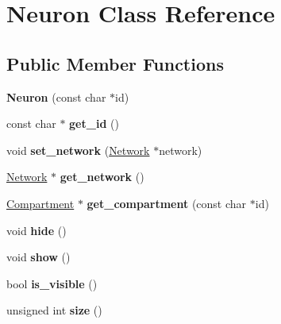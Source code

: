 \hypertarget{classNeuron}{\section{Neuron Class Reference}
\label{classNeuron}
}
\subsection*{Public Member Functions}
\begin{DoxyCompactItemize}
\item 
\hypertarget{classNeuron_a700b5247c7dc30e35371f11027b71889}{{\bfseries Neuron} (const char $\ast$id)}\label{classNeuron_a700b5247c7dc30e35371f11027b71889}

\item 
\hypertarget{classNeuron_af9cb6fa1f5eebae02f76ac4708f32739}{const char $\ast$ {\bfseries get\-\_\-id} ()}\label{classNeuron_af9cb6fa1f5eebae02f76ac4708f32739}

\item 
\hypertarget{classNeuron_ad2f149ae34342bff4efa0e488554b802}{void {\bfseries set\-\_\-network} (\hyperlink{classNetwork}{Network} $\ast$network)}\label{classNeuron_ad2f149ae34342bff4efa0e488554b802}

\item 
\hypertarget{classNeuron_ad91b6fd7beb2cb35b82059e354983ea9}{\hyperlink{classNetwork}{Network} $\ast$ {\bfseries get\-\_\-network} ()}\label{classNeuron_ad91b6fd7beb2cb35b82059e354983ea9}

\item 
\hypertarget{classNeuron_afec51c42ecfc188d64181c10125ab458}{\hyperlink{classCompartment}{Compartment} $\ast$ {\bfseries get\-\_\-compartment} (const char $\ast$id)}\label{classNeuron_afec51c42ecfc188d64181c10125ab458}

\item 
\hypertarget{classNeuron_a0bca1dfb98292631f31734bbe6e54fe5}{void {\bfseries hide} ()}\label{classNeuron_a0bca1dfb98292631f31734bbe6e54fe5}

\item 
\hypertarget{classNeuron_af0e274af219c1d8f45cc511f5d761d2c}{void {\bfseries show} ()}\label{classNeuron_af0e274af219c1d8f45cc511f5d761d2c}

\item 
\hypertarget{classNeuron_aa6fe51d251379fb2514465024740dbd9}{bool {\bfseries is\-\_\-visible} ()}\label{classNeuron_aa6fe51d251379fb2514465024740dbd9}

\item 
\hypertarget{classNeuron_a4ebb973d49a16f4ee332c7b5d5c89d59}{unsigned int {\bfseries size} ()}\label{classNeuron_a4ebb973d49a16f4ee332c7b5d5c89d59}


\end{DoxyCompactItemize}
